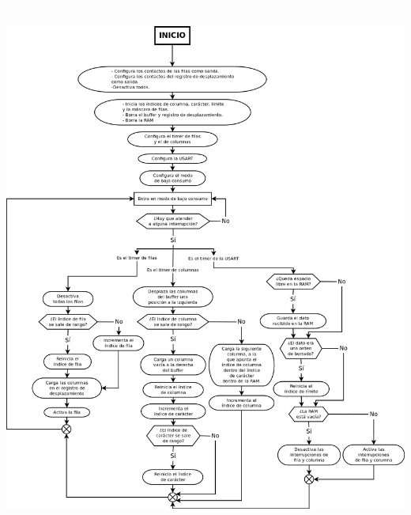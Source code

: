 \documentclass[a4paper,titlepage,10pt,oneside]{article}
\begin{document}
\newpage
  \textcolor{White}{.} \\
  \vspace{1.5cm} \\
  \includegraphics[width=425pt]{./images/dia_flujo.png}
\end{document}
